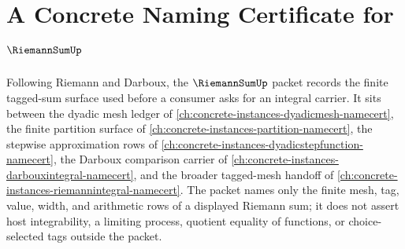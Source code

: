 \chapter{A Concrete Naming Certificate for $\RiemannSumUp$}
\label{ch:concrete-instances-riemannsum-namecert}

Following Riemann and Darboux, the $\RiemannSumUp$ packet records the finite tagged-sum surface used before a consumer asks for an integral carrier. It sits between the dyadic mesh ledger of \autoref{ch:concrete-instances-dyadicmesh-namecert}, the finite partition surface of \autoref{ch:concrete-instances-partition-namecert}, the stepwise approximation rows of \autoref{ch:concrete-instances-dyadicstepfunction-namecert}, the Darboux comparison carrier of \autoref{ch:concrete-instances-darbouxintegral-namecert}, and the broader tagged-mesh handoff of \autoref{ch:concrete-instances-riemannintegral-namecert}. The packet names only the finite mesh, tag, value, width, and arithmetic rows of a displayed Riemann sum; it does not assert host integrability, a limiting process, quotient equality of functions, or choice-selected tags outside the packet.

